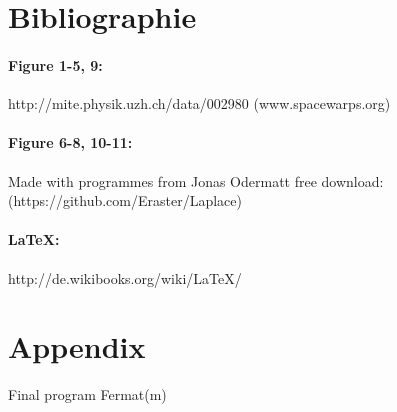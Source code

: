 \documentclass[pdftex,12pt,a4paper]{article}
\begin{document}
\newpage
\section{Bibliographie}
\paragraph{Figure 1-5, 9:}
http://mite.physik.uzh.ch/data/002980 \newline (www.spacewarps.org)
\paragraph{Figure 6-8, 10-11:}
Made with programmes from Jonas Odermatt \newline free download: (https://github.com/Eraster/Laplace)
\paragraph{LaTeX:}
http://de.wikibooks.org/wiki/LaTeX/



\newpage
\section{Appendix}


Final program Fermat(m)
 
\end{document}

